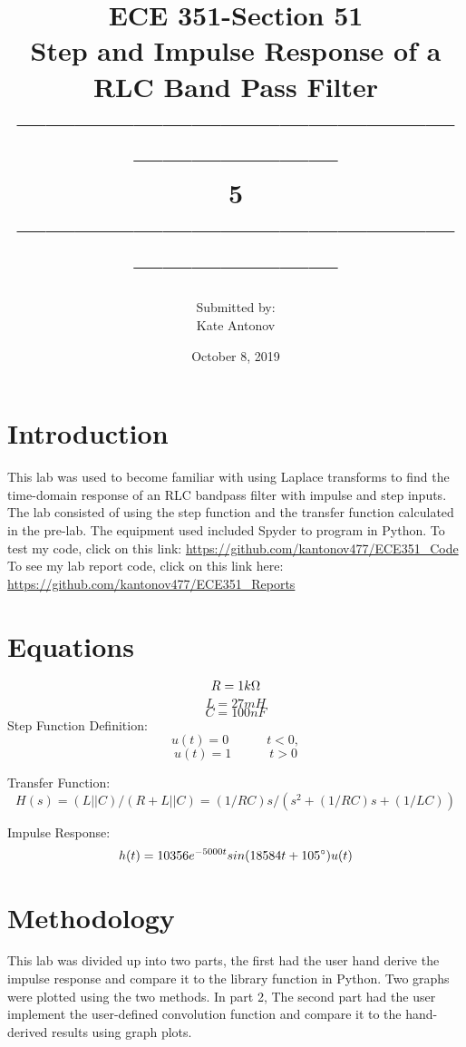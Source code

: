 \documentclass[12pt]{article}
\title{ECE 351-Section 51 \\ Step and Impulse Response of a RLC Band Pass Filter \\ ------------------------------------------------------------------\\ 5 \\------------------------------------------------------------------}
\author{Submitted by: \\  Kate Antonov}
\date{October 8, 2019}
\begin{document}
\vspace{\fill}

\maketitle

\vspace{\fill}
\thispagestyle{empty}
\clearpage

\clearpage
\thispagestyle{empty}
\tableofcontents
\clearpage

\section{Introduction}
This lab was used to become familiar with using Laplace transforms to find the time-domain response of an RLC bandpass filter with impulse and step inputs. The lab consisted of using the step function and the transfer function calculated in the pre-lab. The equipment used included Spyder to program in Python. To test my code, click on this link: 
\url{https://github.com/kantonov477/ECE351_Code}
\newline
To see my lab report code, click on this link here: 
\url{https://github.com/kantonov477/ECE351_Reports}
\section{Equations}
\[R = 1k\ohm\]
\[L = 27mH\]
\[C = 100nF\]
Step Function Definition:
\[u(t) = 0  \hspace{3em} t < 0,\]
\[u(t) = 1  \hspace{3em} t > 0\]

Transfer Function:
\[H(s) = (L||C)/( R + L||C) = (1/RC)s/(s^2 + (1/RC)s + (1/LC))\]

Impulse Response:
\[h(t) = 10356e^{-5000t}sin(18584t + 105\degree)u(t)\] 

\section{ Methodology}
This lab was divided up into two parts, the first had the user hand derive the impulse response and compare it to the library function in Python. Two graphs were plotted using the two methods. In part 2,  The second part had the user implement the user-defined convolution function and compare it to the hand-derived results using graph plots.
\end{document}
